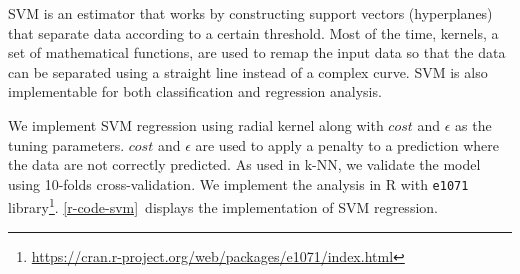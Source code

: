 



	\ac{SVM} is an estimator that works by constructing support vectors (hyperplanes) that separate data according to a certain threshold. Most of the time, kernels, a set of mathematical functions, are used to remap the input data so that the data can be separated using a straight line instead of a complex curve. \ac{SVM} is also implementable for both classification and regression analysis.

	We implement \ac{SVM} regression using radial kernel along with $cost$ and $\epsilon$ as the tuning parameters. $cost$ and $\epsilon$ are used to apply a penalty to a prediction where the data are not correctly predicted. As used in \ac{k-NN}, we validate the model using 10-folds cross-validation. We implement the analysis in R with \verb|e1071| library\footnote{\url{https://cran.r-project.org/web/packages/e1071/index.html}}. \autoref{r-code-svm}~displays the implementation of \ac{SVM} regression.


